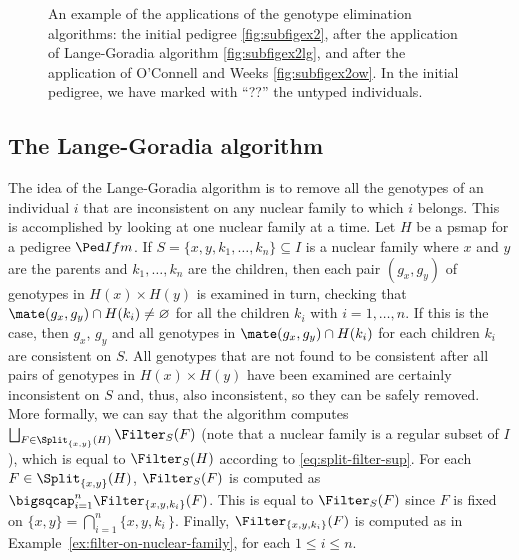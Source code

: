 \begin{figure}
  \centering
  \caption{An example of the applications of the genotype elimination
    algorithms: the initial pedigree \ref{fig:subfigex2}, after the application
    of Lange-Goradia algorithm \ref{fig:subfigex2lg}, and after the application
    of O'Connell and Weeks \ref{fig:subfigex2ow}. In the initial pedigree, we
    have marked with ``??'' the untyped individuals.}
  \label{fig:example2}
\end{figure}






\subsection{The Lange-Goradia algorithm}
\label{sec:lg}

The idea of the Lange-Goradia algorithm is to remove all the genotypes of an individual $i$
that are inconsistent on any nuclear family to which $i$ belongs.
This is accomplished by looking at one nuclear family at a time.
Let $H$ be a psmap for a pedigree $\Ped I f m$.
If $S=\{x,y,k_1,\ldots,k_n\}\subseteq I$ is a nuclear
family where $x$ and $y$ are the parents and $k_1, \ldots, k_n$
are the children, then each pair $(g_x, g_y)$
of genotypes in $H(x)\times H(y)$
is examined in turn, checking that $\mate(g_x, g_y) \cap H(k_i) \neq \varnothing$
for all the children $k_i$ with $i = 1, \ldots,n$.
If this is the case, then $g_x$, $g_y$ and all genotypes in $\mate(g_x, g_y)\cap H(k_i)$
for each children $k_i$ are consistent on $S$. 
All genotypes that are not found to be consistent after all pairs
of genotypes in $H(x)\times H(y)$
have been examined are certainly inconsistent on $S$ and, thus, also inconsistent, so they
can be safely removed.
More formally, we can say that the algorithm computes
$\bigsqcup_{F\in\Split_{\{x,y\}}(H)}\Filter_S(F)$ (note that a nuclear family
is a regular subset of $I$), which is equal to $\Filter_S(H)$ according to \eqref{eq:split-filter-sup}. For each $F\in\Split_{\{x,y\}}(H)$, $\Filter_S(F)$ is computed
as $\bigsqcap_{i=1}^n \Filter_{\{x,y,k_i\}}(F)$. This is equal to $\Filter_S(F)$
since $F$ is fixed on $\{x,y\}=\bigcap_{i=1}^n\{x,y,k_i\,\}$.
Finally, $\Filter_{\{x,y,k_i\}}(F)$ is computed as in Example~\ref{ex:filter-on-nuclear-family},
for each $1\le i \le n$.

